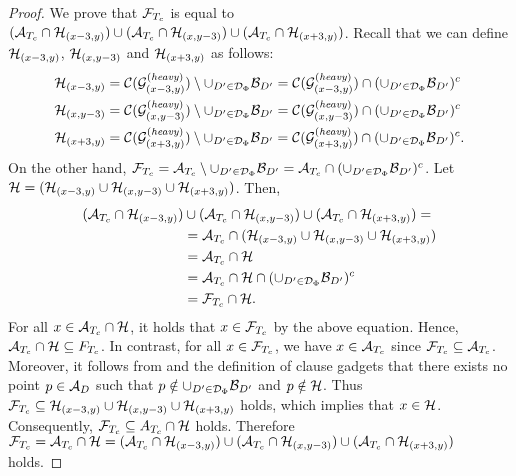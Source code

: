 \begin{toappendix}
\begin{toappendix}
\begin{proof}
    We prove that $\mathcal{F}_{T_c}$ is equal to $(\mathcal{A}_{T_c} \cap \mathcal{H}_{(x-3,y)}) \cup (\mathcal{A}_{T_c} \cap \mathcal{H}_{(x,y-3)}) \cup (\mathcal{A}_{T_c} \cap \mathcal{H}_{(x+3,y)})$.
    Recall that we can define $\mathcal{H}_{(x-3,y)}$, $\mathcal{H}_{(x,y-3)}$ and $\mathcal{H}_{(x+3,y)}$ as follows:
    \begin{align*}
        \mathcal{H}_{(x-3,y)} & = \mathcal{C}(\mathcal{G}_{(x-3,y)}^{(\mathit{heavy})}) \setminus \cup_{D' \in \mathcal{D}_\Phi} \mathcal{B}_{D'} = \mathcal{C}(\mathcal{G}_{(x-3,y)}^{(\mathit{heavy})}) \cap (\cup_{D' \in \mathcal{D}_\Phi} \mathcal{B}_{D'})^c\\
        \mathcal{H}_{(x,y-3)} & = \mathcal{C}(\mathcal{G}_{(x,y-3)}^{(\mathit{heavy})}) \setminus \cup_{D' \in \mathcal{D}_\Phi} \mathcal{B}_{D'} = \mathcal{C}(\mathcal{G}_{(x,y-3)}^{(\mathit{heavy})}) \cap (\cup_{D' \in \mathcal{D}_\Phi} \mathcal{B}_{D'})^c\\
        \mathcal{H}_{(x+3,y)} & = \mathcal{C}(\mathcal{G}_{(x+3,y)}^{(\mathit{heavy})}) \setminus \cup_{D' \in \mathcal{D}_\Phi} \mathcal{B}_{D'} = \mathcal{C}(\mathcal{G}_{(x+3,y)}^{(\mathit{heavy})}) \cap (\cup_{D' \in \mathcal{D}_\Phi} \mathcal{B}_{D'})^c.
    \end{align*}
    On the other hand, $\mathcal{F}_{T_c} = \mathcal{A}_{T_c} \setminus \cup_{D' \in \mathcal{D}_\Phi} \mathcal{B}_{D'} = \mathcal{A}_{T_c} \cap (\cup_{D' \in \mathcal{D}_\Phi} \mathcal{B}_{D'})^c$. Let $\mathcal{H} = (\mathcal{H}_{(x-3,y)} \cup \mathcal{H}_{(x,y-3)} \cup \mathcal{H}_{(x+3,y)})$. Then, 
    \begin{align*}
        (\mathcal{A}_{T_c} \cap \mathcal{H}_{(x-3,y)}) &\cup (\mathcal{A}_{T_c} \cap \mathcal{H}_{(x,y-3)}) \cup (\mathcal{A}_{T_c} \cap \mathcal{H}_{(x+3,y)}) = \\
        &= \mathcal{A}_{T_c} \cap (\mathcal{H}_{(x-3,y)} \cup \mathcal{H}_{(x,y-3)} \cup \mathcal{H}_{(x+3,y)})\\
        & = \mathcal{A}_{T_c} \cap \mathcal{H}\\
        & = \mathcal{A}_{T_c} \cap \mathcal{H} \cap (\cup_{D' \in \mathcal{D}_\Phi} \mathcal{B}_{D'})^c\\
        & = \mathcal{F}_{T_c} \cap \mathcal{H}.
    \end{align*}
    For all $x \in \mathcal{A}_{T_c} \cap \mathcal{H}$, it holds that $x \in \mathcal{F}_{T_c}$ by the above equation. Hence, $\mathcal{A}_{T_c} \cap \mathcal{H} \subseteq F_{T_c}$.
    In contrast, for all $x \in \mathcal{F}_{T_c}$, we have $x \in \mathcal{A}_{T_c}$ since $\mathcal{F}_{T_c} \subseteq \mathcal{A}_{T_c}$.
    Moreover, it follows from  and the definition of clause gadgets that there exists no point $p\in \mathcal{A}_D$ such that $p \notin \cup_{D' \in \mathcal{D}_\Phi} \mathcal{B}_{D'}$ and $p \notin \mathcal{H}$.
    Thus $\mathcal{F}_{T_c} \subseteq \mathcal{H}_{(x-3,y)}\cup \mathcal{H}_{(x,y-3)}\cup \mathcal{H}_{(x+3,y)}$ holds, which implies that $x \in \mathcal{H}$.
    Consequently, $\mathcal{F}_{T_c} \subseteq A_{T_c} \cap \mathcal{H}$ holds.
    Therefore $\mathcal{F}_{T_c} = \mathcal{A}_{T_c} \cap \mathcal{H} = (\mathcal{A}_{T_c} \cap \mathcal{H}_{(x-3,y)}) \cup (\mathcal{A}_{T_c} \cap \mathcal{H}_{(x,y-3)}) \cup (\mathcal{A}_{T_c} \cap \mathcal{H}_{(x+3,y)})$ holds.
\end{proof}


\end{toappendix}
\end{toappendix}
